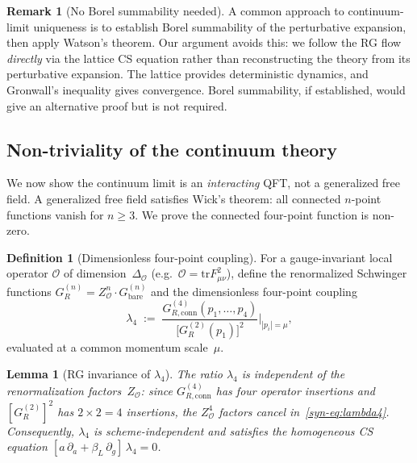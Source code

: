 \documentclass[11pt]{article}
\newtheorem{lemma}[theorem]{Lemma}
\theoremstyle{definition}
\newtheorem{definition}[theorem]{Definition}
\newtheorem{remark}[theorem]{Remark}
\newcommand{\tr}{\mathrm{tr}}
\begin{document}
\begin{remark}[No Borel summability needed]
\label{syn-rem:no_borel}
A common approach to continuum-limit uniqueness is to
establish Borel summability of the perturbative expansion,
then apply Watson's theorem.  Our argument avoids this:
we follow the RG flow \emph{directly} via the lattice
CS equation rather than reconstructing the theory from
its perturbative expansion.  The lattice provides
deterministic dynamics, and Gronwall's inequality gives
convergence.  Borel summability, if established, would
give an alternative proof but is not required.
\end{remark}

\subsection{Non-triviality of the continuum theory}

We now show the continuum limit is an \emph{interacting}
QFT, not a generalized free field.  A generalized free
field satisfies Wick's theorem: all connected $n$-point
functions vanish for $n \geq 3$.  We prove the connected
four-point function is non-zero.

\begin{definition}[Dimensionless four-point coupling]
For a gauge-invariant local operator $\mathcal{O}$
of dimension~$\Delta_{\mathcal{O}}$
\textup{(}e.g.\ $\mathcal{O} = \tr F_{\mu\nu}^2$\textup{)},
define the renormalized Schwinger functions
$G_R^{(n)} = Z_{\mathcal{O}}^n \cdot G_{\mathrm{bare}}^{(n)}$
and the dimensionless four-point coupling
\begin{equation}\label{syn-eq:lambda4}
  \lambda_4
  \;:=\; \frac{G_{R,\mathrm{conn}}^{(4)}(p_1,\ldots,p_4)}
  {\bigl[G_R^{(2)}(p_1)\bigr]^2}
  \bigg|_{|p_i| = \mu},
\end{equation}
evaluated at a common momentum scale~$\mu$.
\end{definition}

\begin{lemma}[RG invariance of $\lambda_4$]
\label{syn-lem:lambda4_rg}
The ratio $\lambda_4$ is independent of the
renormalization factors~$Z_{\mathcal{O}}$:
since $G_{R,\mathrm{conn}}^{(4)}$ has four operator
insertions and $[G_R^{(2)}]^2$ has $2 \times 2 = 4$
insertions, the $Z_{\mathcal{O}}^4$ factors cancel
in~\eqref{syn-eq:lambda4}.  Consequently, $\lambda_4$
is scheme-independent and satisfies the homogeneous
CS equation
$[a\,\partial_a + \beta_L\,\partial_g]\,\lambda_4 = 0$.
\end{lemma}
\end{document}
